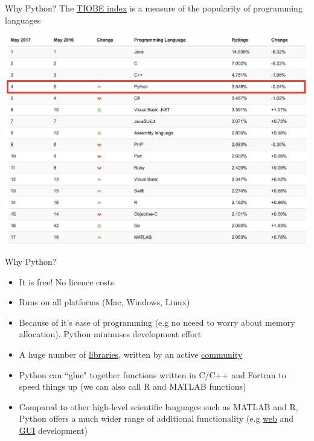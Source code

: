 \documentclass[pdf]{beamer}
\begin{document}
\begin{frame}{Why Python?}
The \href{http://www.tiobe.com/tiobe-index/}{TIOBE index} is a measure of the popularity of programming languages

\centering
\includegraphics[width=.85\textwidth]{tiobe.png}
\end{frame}

\begin{frame}{Why Python?}

\begin{itemize}\addtolength{\itemsep}{0.5\baselineskip}
	\item<1-> It is free! No licence costs
	\item<2-> Runs on all platforms (Mac, Windows, Linux)
	\item<3-> Because of it's ease of programming (e.g no neeed to worry about memory allocation), Python minimises development effort
	\item<4-> A huge number of \href{https://pypi.python.org/pypi}{libraries}, written by an active \href{https://www.python.org/community/}{community}  
	\item<5-> Python can ``glue" together functions written in C/C++ and Fortran to speed things up (we can also call R and MATLAB functions)
	\item<6-> Compared to other high-level scientific languages such as MATLAB and R, Python offers a much wider range of additional functionality (e.g \href{https://www.djangoproject.com/}{web} and \href{https://wiki.python.org/moin/TkInter}{GUI} development) %
\end{itemize}

\end{frame}
\end{document}
